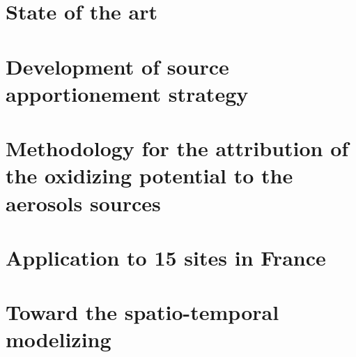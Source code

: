 \documentclass[a4paper,12pt]{memoir}
\begin{document}
\chapter{State of the art}%
\label{cha:state_of_the_art}


\chapter{Development of source apportionement strategy}%
\label{cha:chapter02}



\chapter{Methodology for the attribution of the oxidizing potential to the aerosols sources}%
\label{cha:methodology_for_the_attribution_of_intrisinc_op_to_a_pm_source}


\chapter{Application to 15 sites in France}%
\label{cha:application_to_15_sites_in_France}


\chapter{Toward the spatio-temporal modelizing}%
\label{cha:spatio_temporal_modelizing}


\printbibliography
\bibbysegment[heading=subbibliography]

\appendix
\setcounter{table}{0}
\setcounter{figure}{0}
\setcounter{equation}{0}
\renewcommand{\thetable}{\thesection-\arabic{table}}
\renewcommand{\thefigure}{\thesection-\arabic{figure}}
\renewcommand{\theequation}{\thesection-\arabic{equation}}
\end{document}
